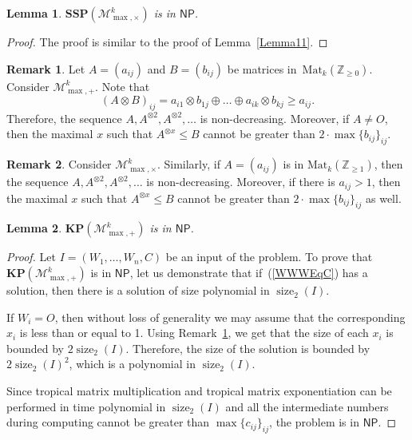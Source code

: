 \documentclass[reqno,12pt]{amsart}
\newtheorem{lemma}{Lemma}
\theoremstyle{definition}
\newtheorem{remark}{Remark}
\newcommand{\Mat}{\mathrm{Mat}}
\newcommand{\NP}{\mathsf{NP}}
\newcommand{\MP}{\mathcal{M}_{\max, {+}}^k}
\newcommand{\MT}{\mathcal{M}_{\max, {\times}}^k}
\newcommand{\SSMTP}{\mathbf{SSP}(\MT)}
\newcommand{\KMPP}{\mathbf{KP}(\MP)}
\DeclareMathOperator{\size}{size}
\begin{document}
\begin{lemma}\label{Lemma12}
    $\SSMTP$ is in $\NP$.
\end{lemma}

\begin{proof}
    The proof is similar to the proof of Lemma~\ref{Lemma11}.
\end{proof}

\begin{remark}\label{Remark1}
Let $A = (a_{ij})$ and $B = (b_{ij})$ be matrices in~$\Mat_k(\mathbb{Z}_{{\geq 0}})$.
Consider $\MP$. Note that 
$$(A \otimes B)_{ij} = a_{i1} \otimes b_{1j} \oplus \dots \oplus a_{ik} \otimes b_{kj} \geq a_{ij}.$$ 
Therefore, the sequence $A, A^{\otimes 2}, A^{\otimes 2}, \ldots$ is non-decreasing. Moreover, if $A \neq O$, then the maximal $x$ such that $A^{\otimes x} \leq B$ cannot be greater than $2 \cdot \max\{b_{ij}\}_{ij}$. 
\end{remark}

\begin{remark}\label{Remark2}
Consider $\MT$. Similarly, if $A = (a_{ij})$ is in $\Mat_k(\mathbb{Z}_{{\geq 1}})$, then the sequence 
$A, A^{\otimes 2}, A^{\otimes 2}, \ldots$ is non-decreasing. Moreover, if there is $a_{ij} > 1$, then
the maximal $x$ such that $A^{\otimes x} \leq B$ cannot be greater than $2 \cdot \max\{b_{ij}\}_{ij}$ as well.
\end{remark}

\begin{lemma}\label{Lemma13}
$\KMPP$ is in $\NP$.
\end{lemma}

\begin{proof}
Let $I = (W_1, \ldots, W_n, C)$ be an input of the problem.
To prove that $\KMPP$ is in $\NP$, let us demonstrate that if~(\ref{WWWEqC}) has a solution, then there is a solution of size polynomial in $\size_2(I)$.

If $W_i = O$, then without loss of generality we may assume that the corresponding $x_i$ is less than or equal to 1.
Using Remark~\ref{Remark1}, we get that the size of each $x_i$ is bounded by $2\size_2(I)$.
Therefore, the size of the solution is bounded by $2\size_2(I)^2$, which is a polynomial in $\size_2(I)$.

Since tropical matrix multiplication and tropical matrix exponentiation can be performed in time polynomial in $\size_2(I)$ and all the 
intermediate numbers during computing cannot be greater than $\max\{c_{ij}\}_{ij}$, the problem is in $\NP$.
\end{proof}
\end{document}
